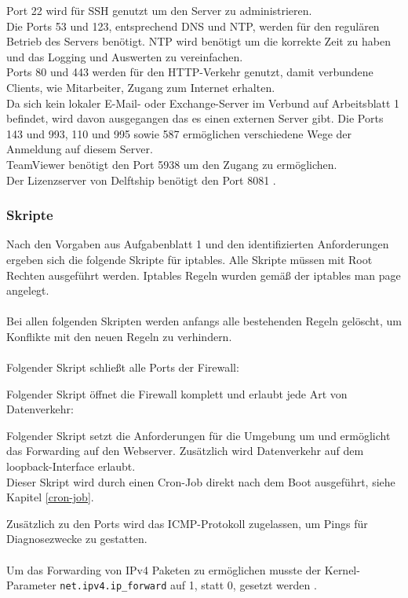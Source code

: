 \documentclass[
    a4paper,
    pagesize,
	pdftex,
    12pt,
]{scrartcl}
\begin{document}
Port 22 wird für SSH genutzt um den Server zu administrieren. \\
Die Ports 53 und 123, entsprechend DNS und NTP, werden für den regulären Betrieb des Servers benötigt. NTP wird benötigt um die korrekte Zeit zu haben und das Logging und Auswerten zu vereinfachen. \\
Ports 80 und 443 werden für den HTTP-Verkehr genutzt, damit verbundene Clients, wie Mitarbeiter, Zugang zum Internet erhalten. \\
Da sich kein lokaler E-Mail- oder Exchange-Server im Verbund auf Arbeitsblatt 1 befindet, wird davon ausgegangen das es einen externen Server gibt. Die Ports 143 und 993, 110 und 995 sowie 587 ermöglichen verschiedene Wege der Anmeldung auf diesem Server. \\
TeamViewer benötigt den Port 5938 um den Zugang zu ermöglichen. \\
Der Lizenzserver von Delftship benötigt den Port 8081 \cite{delftship}.

\subsubsection{Skripte}
Nach den Vorgaben aus Aufgabenblatt 1 und den identifizierten Anforderungen ergeben sich die folgende Skripte für iptables. Alle Skripte müssen mit  Root Rechten ausgeführt werden.  Iptables Regeln wurden gemäß der iptables man page \cite{iptables-manpage} angelegt. \\ \\ 
Bei allen folgenden Skripten werden anfangs alle bestehenden Regeln gelöscht, um Konflikte mit den neuen Regeln zu verhindern. \\ \\
Folgender Skript schließt alle Ports der Firewall:

Folgender Skript öffnet die Firewall komplett und erlaubt jede Art von Datenverkehr:

Folgender  Skript setzt die Anforderungen für die Umgebung um und ermöglicht das Forwarding auf den Webserver. Zusätzlich  wird  Datenverkehr auf dem  loopback-Interface erlaubt. \\
Dieser Skript wird durch einen Cron-Job direkt nach dem Boot ausgeführt, siehe Kapitel \ref{cron-job}.

Zusätzlich zu den Ports wird das ICMP-Protokoll zugelassen, um Pings für Diagnosezwecke zu gestatten.
\\ \\
Um das Forwarding von IPv4 Paketen zu ermöglichen musste der Kernel-Parameter \lstinline[breaklines]|net.ipv4.ip_forward| auf 1, statt 0, gesetzt werden \cite{ipv4forward-kernel}. 
\end{document}
